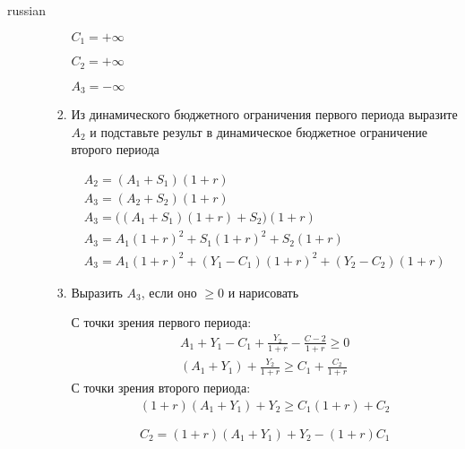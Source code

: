 \documentclass{article}
\begin{document}
\begin{otherlanguage*}{russian}
\begin{enumerate}
\begin{enumerate}
\begin{enumerate}
$ C_1 = + \infty $ 

$ C_2 = + \infty $ 

$ A_3 = - \infty $ 
 
\item Из динамического бюджетного ограничения первого периода выразите $ A_2 $ и подставьте результ в динамическое бюджетное ограничение второго периода 

\begin{align}
A_2 = (A_1 + S_1) (1 +r) \\
A_3 = (A_2 + S_2) (1 + r) \\
A_3 = \Big( (A_1 + S_1) (1 + r) + S_2 \Big) (1 + r) \\
A_3 = A_1 (1 + r)^2 + S_1 (1 + r)^ 2 + S_2 ( 1+ r) \\
A_3 = A_1 (1 + r)^2 + (Y_1 - C_1) (1 + r)^ 2 + (Y_2 - C_2) ( 1+ r) 
\end{align}

\item Выразить $A_3$, если оно $ \ge 0 $ и нарисовать 

С точки зрения первого периода:
\begin{align}
A_1 + Y_1 - C_1 + \frac{Y_2}{1 + r} - \frac{C-2}{1 +r } \ge 0 \\
(A_1 + Y_1) + \frac{Y_2}{1 + r} \ge C_1 + \frac{C_2}{1 + r} 
\end{align}
С точки зрения второго периода:
\begin{align}
(1 + r)(A_1 + Y_1) + Y_2 \ge C_1 ( 1 + r) + C_2 
\end{align}


\begin{equation}
C_2 = (1 + r) (A_1 + Y_1) + Y_2 - (1 + r) C_1
\end{equation}



\end{enumerate}
\end{enumerate}
\end{enumerate}
\end{otherlanguage*}
\end{document}
